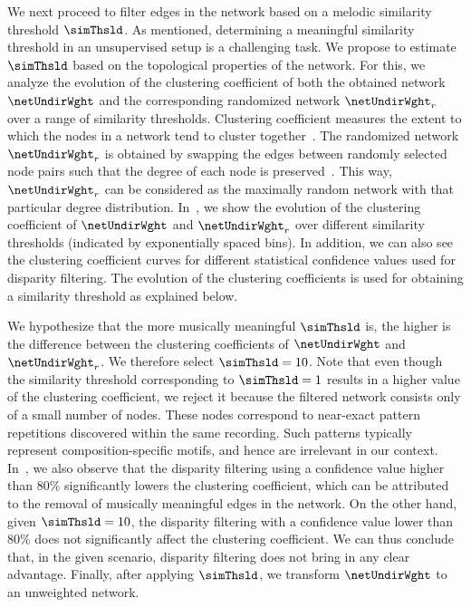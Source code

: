 {We next proceed to filter edges in the network based on a melodic similarity threshold $\simThsld$. As mentioned, determining a meaningful similarity threshold in an unsupervised setup is a challenging task. We propose to estimate $\simThsld$ based on the topological properties of the network. For this, we analyze the evolution of the clustering coefficient of both the obtained network $\netUndirWght$ and the corresponding randomized network $\netUndirWght_r$ over a range of similarity thresholds. Clustering coefficient measures the extent to which the nodes in a network tend to cluster together~\citep{newman2003structure}. The randomized network $\netUndirWght_r$ is obtained by swapping the edges between randomly selected node pairs such that the degree of each node is preserved~\citep{maslov2002specificity}. This way, $\netUndirWght_r$ can be considered as the maximally random network with that particular degree distribution. In~, we show the evolution of the clustering coefficient of $\netUndirWght$ and $\netUndirWght_r$ over different similarity thresholds (indicated by exponentially spaced bins). In addition, we can also see the clustering coefficient curves for different statistical confidence values used for disparity filtering. The evolution of the clustering coefficients is used for obtaining a similarity threshold as explained below.

We hypothesize that the more musically meaningful $\simThsld$ is, the higher is the difference between the clustering coefficients of $\netUndirWght$ and $\netUndirWght_r$. We therefore select $\simThsld=10$. Note that even though the similarity threshold corresponding to $\simThsld=1$ results in a higher value of the clustering coefficient, we reject it because the filtered network consists only of a small number of nodes. These nodes correspond to near-exact pattern repetitions discovered within the same recording. Such patterns typically represent composition-specific motifs, and hence are irrelevant in our context. In~, we also observe that the disparity filtering using a confidence value higher than 80\% significantly lowers the clustering coefficient, which can be attributed to the removal of musically meaningful edges in the network. On the other hand, given $\simThsld=10$, the disparity filtering with a confidence value lower than 80\% does not significantly affect the clustering coefficient. We can thus conclude that, in the given scenario, disparity filtering does not bring in any clear advantage. Finally, after applying $\simThsld$, we transform $\netUndirWght$ to an unweighted network. 


}
